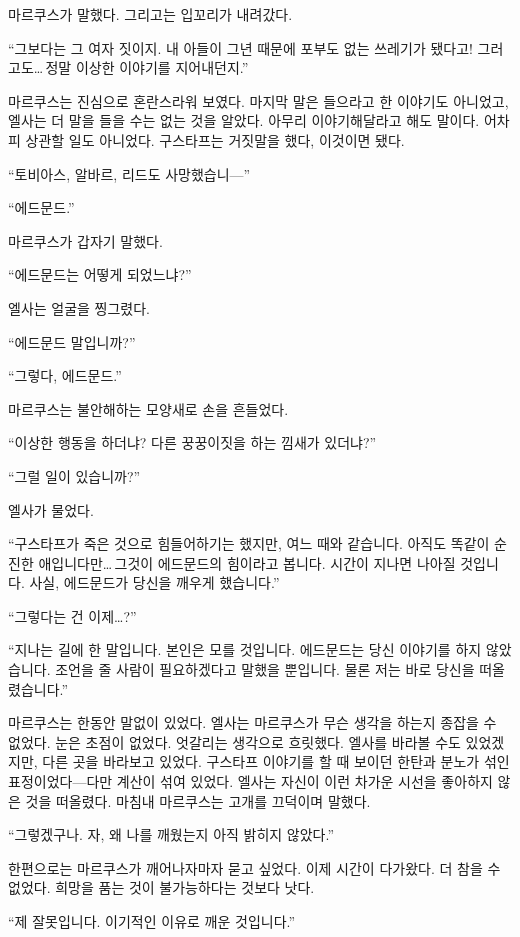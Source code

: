 마르쿠스가 말했다. 그리고는 입꼬리가 내려갔다.

``그보다는 그 여자 짓이지. 내 아들이 그년 때문에 포부도 없는 쓰레기가 됐다고! 그러고도\ldots\,정말 이상한 이야기를 지어내던지.''

마르쿠스는 진심으로 혼란스라워 보였다. 마지막 말은 들으라고 한 이야기도 아니었고, 엘사는 더 말을 들을 수는 없는 것을 알았다. 아무리 이야기해달라고 해도 말이다. 어차피 상관할 일도 아니었다. 구스타프는 거짓말을 했다, 이것이면 됐다.

``토비아스, 알바르, 리드도 사망했습니—''

``에드문드.''

마르쿠스가 갑자기 말했다.

``에드문드는 어떻게 되었느냐?''

엘사는 얼굴을 찡그렸다.

``에드문드 말입니까?''

``그렇다, 에드문드.''

마르쿠스는 불안해하는 모양새로 손을 흔들었다.

``이상한 행동을 하더냐? 다른 꿍꿍이짓을 하는 낌새가 있더냐?''

``그럴 일이 있습니까?''

엘사가 물었다.

``구스타프가 죽은 것으로 힘들어하기는 했지만, 여느 때와 같습니다. 아직도 똑같이 순진한 애입니다만\ldots\,그것이 에드문드의 힘이라고 봅니다. 시간이 지나면 나아질 것입니다. 사실, 에드문드가 당신을 깨우게 했습니다.''

``그렇다는 건 이제\ldots?''

``지나는 길에 한 말입니다. 본인은 모를 것입니다. 에드문드는 당신 이야기를 하지 않았습니다. 조언을 줄 사람이 필요하겠다고 말했을 뿐입니다. 물론 저는 바로 당신을 떠올렸습니다.''

마르쿠스는 한동안 말없이 있었다. 엘사는 마르쿠스가 무슨 생각을 하는지 종잡을 수 없었다. 눈은 초점이 없었다. 엇갈리는 생각으로 흐릿했다. 엘사를 바라볼 수도 있었겠지만, 다른 곳을 바라보고 있었다. 구스타프 이야기를 할 때 보이던 한탄과 분노가 섞인 표정이었다—다만 계산이 섞여 있었다. 엘사는 자신이 이런 차가운 시선을 좋아하지 않은 것을 떠올렸다. 마침내 마르쿠스는 고개를 끄덕이며 말했다.

``그렇겠구나. 자, 왜 나를 깨웠는지 아직 밝히지 않았다.''

한편으로는 마르쿠스가 깨어나자마자 묻고 싶었다. 이제 시간이 다가왔다. 더 참을 수 없었다. 희망을 품는 것이 불가능하다는 것보다 낫다.

``제 잘못입니다. 이기적인 이유로 깨운 것입니다.''

